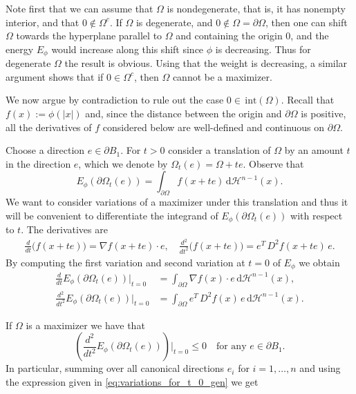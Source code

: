 \documentclass[10pt,leqno]{amsart}
\makeatletter
\newcommand{\p}{\partial}
\newcommand{\interior}{\, \mathrm{int}}
\newcommand{\delomega}{\partial\Omega}
\newcommand{\dH}{\, \mathrm{d} \mathcal{H}^{n-1}}
\numberwithin{Theorem}{section}
\theoremstyle{definition}
\theoremstyle{remark}
\numberwithin{equation}{section}
\numberwithin{equation}{section}
\newenvironment{customproof}[1]{%
  \par\pushQED{\qed}%
  \normalfont\topsep6pt \trivlist
  \item[\hskip\labelsep\itshape
    Proof of #1\@addpunct{.}]\ignorespaces
}{%
  \popQED\endtrivlist\@endpefalse
}
\makeatother
\begin{document}
\begin{customproof}{Theorem \ref{thm:shifting_generalized}}
Note first that we can assume that $\Omega$ is nondegenerate, that is, it has nonempty interior, and that $0\notin\Omega^c$.   If $\Omega$ is degenerate, and $0\notin \Omega=\delomega$, then one can shift $\Omega$ towards the hyperplane parallel to $\Omega$ and containing the origin  $0$, and the energy $E_{\phi}$ would increase along this shift since $\phi$ is decreasing. Thus for degenerate $\Omega$ the result is obvious. Using that the weight is decreasing, a similar argument shows that if $0\in \Omega^c$, then $\Omega$ cannot be a maximizer.

We now argue by contradiction to rule out the case $0 \in \interior(\Omega)$.  Recall that $f(x):=\phi(|x|)$ and, since the distance between the origin and $\p \Omega$ is positive, all the derivatives of $f$ considered below are well-defined and continuous on $\p\Omega$.

Choose a direction $e \in \p B_1$. For $t>0$ consider a translation of $\Omega$ by an amount $t$ in the direction $e$, which we denote by $\Omega_t(e) = \Omega + te$. Observe that 
\[
E_{\phi}(\p \Omega_t(e)) = \int_{\p \Omega} f(x+te) \dH(x).
\]
 We want to consider variations of a maximizer under this translation and thus it will be convenient to differentiate the integrand of $E_{\phi}(\p \Omega_t(e))$ with respect to $t$.
The derivatives are
\begin{align*}
\frac{d}{dt} \big( f(x+te) \big) = \nabla f(x+te) \cdot e, \quad
\frac{d^2}{dt^2} \big( f(x+te) \big) = e^T \, D^2 f(x+te) \, e. 
\end{align*}
 By computing the first variation and second variation at $t=0$ of  $E_{\phi}$ we obtain
\begin{align}  \label{eq:first-variation_gen}
\frac{d}{d t} E_{\phi}(\p \Omega_t(e)) \Big|_{t=0} &=  \int_{\p \Omega} \nabla f(x) \cdot e    \dH(x) ,
\\ \label{eq:variations_for_t_0_gen}
\frac{d^2}{d t^2} E_{\phi}(\p \Omega_t(e)) \Big|_{t=0} &= \int_{\p \Omega}  e^T \, D^2 f(x) \, e \dH(x).
\end{align} 


If $\Omega$ is a maximizer we have that 
\[
\left(\frac{d^2}{d t^2} E_{\phi}(\p \Omega_t(e)) \right)\!\Big|_{t=0} \leq 0 \quad \text{for any }e \in \p B_1.
\]
In particular, summing over all canonical directions $e_i$ for $i=1,\dots,n$ and using the expression given in \eqref{eq:variations_for_t_0_gen} we get


\end{customproof}
\end{document}
